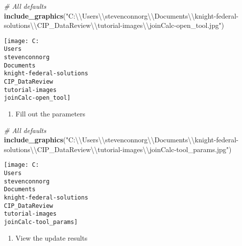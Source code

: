 \documentclass[]{article}
\newenvironment{Shaded}{\begin{snugshade}}{\end{snugshade}}
\newcommand{\KeywordTok}[1]{\textcolor[rgb]{0.13,0.29,0.53}{\textbf{#1}}}
\newcommand{\CharTok}[1]{\textcolor[rgb]{0.31,0.60,0.02}{#1}}
\newcommand{\StringTok}[1]{\textcolor[rgb]{0.31,0.60,0.02}{#1}}
\newcommand{\CommentTok}[1]{\textcolor[rgb]{0.56,0.35,0.01}{\textit{#1}}}
\newcommand{\NormalTok}[1]{#1}
\providecommand{\tightlist}{%
  \setlength{\itemsep}{0pt}\setlength{\parskip}{0pt}}
\begin{document}
\begin{Shaded}
\begin{Highlighting}[]
\CommentTok{# All defaults}
\KeywordTok{include_graphics}\NormalTok{(}\StringTok{"C:}\CharTok{\textbackslash{}\textbackslash{}}\StringTok{Users}\CharTok{\textbackslash{}\textbackslash{}}\StringTok{stevenconnorg}\CharTok{\textbackslash{}\textbackslash{}}\StringTok{Documents}\CharTok{\textbackslash{}\textbackslash{}}\StringTok{knight-federal-solutions}\CharTok{\textbackslash{}\textbackslash{}}\StringTok{CIP_DataReview}\CharTok{\textbackslash{}\textbackslash{}}\StringTok{tutorial-images}\CharTok{\textbackslash{}\textbackslash{}}\StringTok{joinCalc-open_tool.jpg"}\NormalTok{)}
\end{Highlighting}
\end{Shaded}

\texttt{[image: C:\\Users\\stevenconnorg\\Documents\\knight-federal-solutions\\CIP\_DataReview\\tutorial-images\\joinCalc-open\_tool]}

\begin{enumerate}
\def\labelenumi{\arabic{enumi}.}
\setcounter{enumi}{1}
\tightlist
\item
  Fill out the parameters
\end{enumerate}

\begin{Shaded}
\begin{Highlighting}[]
\CommentTok{# All defaults}
\KeywordTok{include_graphics}\NormalTok{(}\StringTok{"C:}\CharTok{\textbackslash{}\textbackslash{}}\StringTok{Users}\CharTok{\textbackslash{}\textbackslash{}}\StringTok{stevenconnorg}\CharTok{\textbackslash{}\textbackslash{}}\StringTok{Documents}\CharTok{\textbackslash{}\textbackslash{}}\StringTok{knight-federal-solutions}\CharTok{\textbackslash{}\textbackslash{}}\StringTok{CIP_DataReview}\CharTok{\textbackslash{}\textbackslash{}}\StringTok{tutorial-images}\CharTok{\textbackslash{}\textbackslash{}}\StringTok{joinCalc-tool_params.jpg"}\NormalTok{)}
\end{Highlighting}
\end{Shaded}

\texttt{[image: C:\\Users\\stevenconnorg\\Documents\\knight-federal-solutions\\CIP\_DataReview\\tutorial-images\\joinCalc-tool\_params]}

\begin{enumerate}
\def\labelenumi{\arabic{enumi}.}
\setcounter{enumi}{2}
\tightlist
\item
  View the update results
\end{enumerate}
\end{document}

